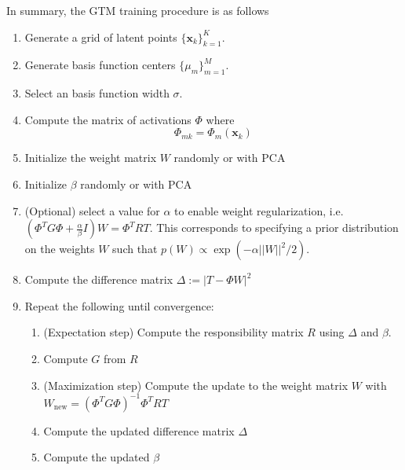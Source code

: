 In summary, the GTM training procedure is as follows
\begin{enumerate}
  \item Generate a grid of latent points $\{\mathbf{x}_k\}_{k=1}^K$.
  \item Generate basis function centers $\{\mu_m\}_{m=1}^M$.
  \item Select an basis function width $\sigma$.
  \item Compute the matrix of activations $\Phi$ where
    \begin{equation}
      \Phi_{mk} = \Phi_m(\mathbf{x}_k)
    \end{equation}
  \item Initialize the weight matrix $W$ randomly or with PCA
  \item Initialize $\beta$ randomly or with PCA
  \item (Optional) select a value for $\alpha$ to enable weight regularization, i.e. $(\Phi^TG\Phi + \frac{\alpha}{\beta}I)W=\Phi^TRT$. This corresponds to specifying a prior distribution on the weights $W$ such that $p(W)\propto \exp(-\alpha||W||^2/2)$.
  \item Compute the difference matrix $\Delta := \lvert T - \Phi W\rvert^2$
  \item Repeat the following until convergence:
    \begin{enumerate}
      \item (Expectation step) Compute the responsibility matrix $R$ using $\Delta$ and $\beta$.
      \item Compute $G$ from $R$
      \item (Maximization step) Compute the update to the weight matrix $W$ with $W_{\text{new}} = \left(\Phi^TG\Phi\right)^{-1}\Phi^TRT$
      \item Compute the updated difference matrix $\Delta$
      \item Compute the updated $\beta$
    \end{enumerate}
\end{enumerate}

